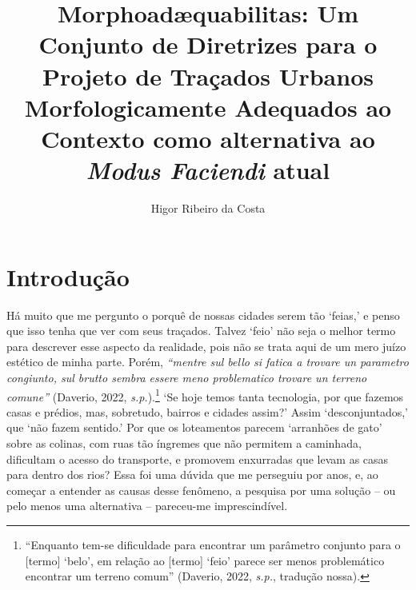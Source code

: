 \documentclass[]{report}
\title{\textbf{Morphoadæquabilitas}: Um Conjunto de Diretrizes para o Projeto de Traçados Urbanos Morfologicamente Adequados ao Contexto como alternativa ao \textit{Modus Faciendi} atual}
\author{Higor Ribeiro da Costa}
\begin{document}
\maketitle

\tableofcontents

\begin{abstract}
\end{abstract}

	\chapter*{Introdução}
	\onehalfspacing

	Há muito que me pergunto o porquê de nossas cidades serem tão `feias,' e penso que isso tenha que ver com seus traçados. Talvez `feio' não seja o melhor termo para descrever esse aspecto da realidade, pois não se trata aqui de um mero juízo estético de minha parte. Porém, \textit{``mentre sul bello si fatica a trovare un parametro congiunto, sul brutto sembra essere meno problematico trovare un terreno comune''} (Daverio, 2022, \textit{s.p.}).\footnote[1]{``Enquanto tem-se dificuldade para encontrar um parâmetro conjunto para o [termo] `belo', em relação ao [termo] `feio' parece ser menos problemático encontrar um terreno comum'' (Daverio, 2022, \textit{s.p.}, tradução nossa).} `Se hoje temos tanta tecnologia, por que fazemos casas e prédios, mas, sobretudo, bairros e cidades assim?' Assim `desconjuntados,' que `não fazem sentido.' Por que os loteamentos parecem `arranhões de gato' sobre as colinas, com ruas tão íngremes que não permitem a caminhada, dificultam o acesso do transporte, e promovem enxurradas que levam as casas para dentro dos rios? Essa foi uma dúvida que me perseguiu por anos, e, ao começar a entender as causas desse fenômeno, a pesquisa por uma solução – ou pelo menos uma alternativa – pareceu-me imprescindível.
	
\end{document}

